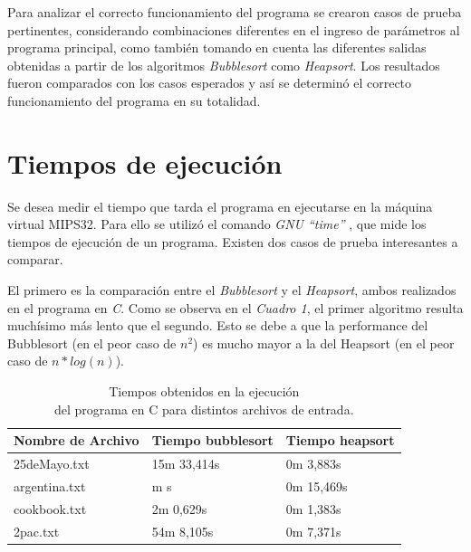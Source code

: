 \documentclass{article}
\begin{document}
	Para analizar el correcto funcionamiento del programa se crearon casos de prueba pertinentes, considerando combinaciones diferentes en el ingreso de parámetros al programa principal, como también tomando en cuenta las diferentes salidas obtenidas a partir de los algoritmos \textit{Bubblesort} como \textit{Heapsort}. Los resultados fueron comparados con los casos esperados y así se determinó el correcto funcionamiento del programa en su totalidad.
\bigskip



\section{Tiempos de ejecución}

	\par
	Se desea medir el tiempo que tarda el programa en ejecutarse en la máquina virtual MIPS32. Para ello se utilizó el comando \textit{GNU ``time''} \cite{TIME}, que mide los tiempos de ejecución de un programa. Existen dos casos de prueba interesantes a comparar. 
	\par
	El primero es la comparación entre el \textit{Bubblesort} y el \textit{Heapsort}, ambos realizados en el programa en \textit{C}. Como se observa en el \textit{Cuadro 1}, el primer algoritmo resulta muchísimo más lento que el segundo. Esto se debe a que la performance del Bubblesort (en el peor caso de \(n^2\)) es mucho mayor a la del Heapsort (en el peor caso de \(n*log(n)\)).
	\medskip
	\newpage

	\begin{table}[!hbt]
		\begin{center}
		\begin{tabular}{|>{\centering\arraybackslash}m{3cm}|>{\centering \arraybackslash}m{3cm}|>{\centering \arraybackslash}m{3cm}|}
			\hline
			\rowcolor[gray]{0.9}\textbf{Nombre de Archivo} & \textbf{Tiempo bubblesort} & \textbf{Tiempo heapsort}\\
			\hline
			\centering 25deMayo.txt & 15m 33,414s & 0m 3,883s \\
			\hline
			\centering argentina.txt & m s & 0m 15,469s \\
			\hline
			\centering cookbook.txt & 2m 0,629s & 0m 1,383s \\
			\hline
			\centering 2pac.txt & 54m 8,105s & 0m 7,371s \\
			\hline
		\end{tabular}
		\smallskip
		\caption{Tiempos obtenidos en la ejecución\\ del programa en C para distintos archivos de entrada.}
		\end{center}
	\end{table}
	\bigskip
	
\end{document}
